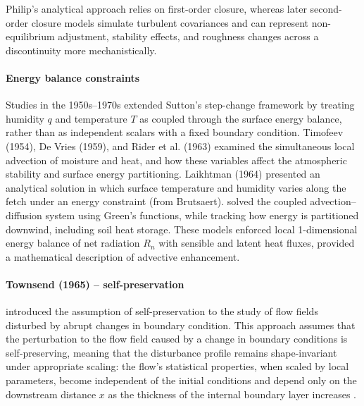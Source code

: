 \documentclass{article}
\begin{document}
    Philip’s analytical approach relies on first-order closure, whereas later second-order closure models \citet[e.g., ][]{rao1974local} simulate turbulent covariances and can represent non-equilibrium adjustment, stability effects, and roughness changes across a discontinuity more mechanistically. 
    
     \paragraph{Energy balance constraints}
    
     Studies in the 1950s–1970s extended Sutton’s step-change framework by treating humidity $q$ and temperature $T$ as coupled through the surface energy balance, rather than as independent scalars with a fixed boundary condition. 
    Timofeev (1954), De Vries (1959), and Rider et al. (1963) examined the simultaneous local advection of moisture and heat, and how these variables affect the atmospheric stability and surface energy partitioning.
    Laikhtman (1964) presented an analytical solution in which surface temperature and humidity varies along the fetch under an energy constraint (from Brutsaert).
     \citet{yeh_solution_1971}  solved the coupled advection–diffusion system using Green’s functions, while tracking how  energy is partitioned downwind, including soil heat storage. 
    These models enforced local 1-dimensional energy balance of net radiation $R_n$ with sensible and latent heat fluxes,
    provided a mathematical description of 
    advective enhancement.
    
    \paragraph{Townsend (1965) -- self-preservation}
    \citet{townsend_response_1965,townsend_self-preserving_1965} introduced the assumption of self-preservation to the study of flow fields disturbed by abrupt changes in boundary condition.
    This approach assumes that the perturbation to the flow field caused by a change in boundary conditions is self-preserving, meaning that the disturbance profile remains shape-invariant under appropriate scaling: the flow's statistical properties, when scaled by local parameters, become independent of the initial conditions and depend only on the downstream distance $x$ as the thickness of the internal boundary layer increases \cite{antonia1977response}.
    
\end{document}
